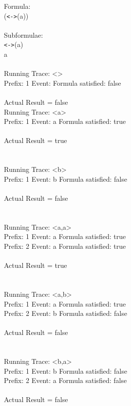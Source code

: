Formula:\\
(\texttt{\textless -\textgreater}(a))\\
\\
Subformulae:\\
\texttt{\textless -\textgreater}(a)\\
a\\
\\
Running Trace: \textless \textgreater\\
  Prefix: 1 Event:  Formula satisfied: false\\
\\
Actual Result = false\\

\noindent Running Trace: \textless a\textgreater\\
  Prefix: 1 Event: a Formula satisfied: true\\
\\
Actual Result = true\\
\\
\\
Running Trace: \textless b\textgreater\\
  Prefix: 1 Event: b Formula satisfied: false\\
\\
Actual Result = false\\
\\
\\
Running Trace: \textless a,a\textgreater\\
  Prefix: 1 Event: a Formula satisfied: true\\
  Prefix: 2 Event: a Formula satisfied: true\\
\\
Actual Result = true\\
\\
\\
Running Trace: \textless a,b\textgreater\\
  Prefix: 1 Event: a Formula satisfied: true\\
  Prefix: 2 Event: b Formula satisfied: false\\
\\
Actual Result = false\\
\\
\\
Running Trace: \textless b,a\textgreater\\
  Prefix: 1 Event: b Formula satisfied: false\\
  Prefix: 2 Event: a Formula satisfied: false\\
\\
Actual Result = false\\
\\
\\
\newpage


